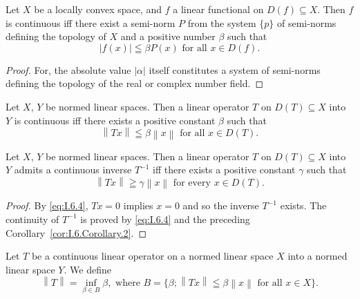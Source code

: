 \begin{corollary}\label{cor:I.6.Corollary.1} Let $X$ be a locally convex space, and $f$ a linear functional on $D(f) \subseteq X$. Then $f$ is continuous iff there exist a semi-norm $P$ from the system $\{p\}$ of semi-norms defining the topology of $X$ and a positive number $\beta$ such that 
\begin{equation}\label{eq:I.6.2}
\left| f (x) \right| \leqq \beta P(x) \text{ for all } x \in D (f).
\end{equation}
\end{corollary}

\begin{proof}
 For, the absolute value $|\alpha|$ itself constitutes a system of semi-norms defining the topology of the real or complex number field. 
\end{proof}

\begin{corollary}\label{cor:I.6.Corollary.2} Let $X$, $Y$ be normed linear spaces. Then a linear operator $T$ on $D(T) \subseteq X$ into $Y$ is continuous iff there exists a positive constant $\beta$ such that 
\begin{equation}\label{eq:I.6.3}
\left\| T x \right\| \leqq \beta \left\| x \right\| \text{ for all } x \in D (T).
\end{equation}
\end{corollary}

\begin{corollary}\label{cor:I.6.Corollary.3} Let $X$, $Y$ be normed linear spaces. Then a linear operator $T$ on $D(T) \subseteq X$ into $Y$ admits a continuous inverse $T^{-1}$ iff there exists a positive constant $\gamma$ such that 
\begin{equation}\label{eq:I.6.4}
\left\| T x \right\| \geqq \gamma \left\| x \right\| \text{ for every } x \in D (T).
\end{equation}
\end{corollary}

\begin{proof}
 By \eqref{eq:I.6.4}, $Tx = 0$ implies $x = 0$ and so the inverse $T^{-1}$ exists. The continuity of $T^{-1}$ is proved by \eqref{eq:I.6.4} and the preceding Corollary~\ref{cor:I.6.Corollary.2}. 
\end{proof}

\begin{definition}\label{def:I.6.Definition.1} Let $T$ be a continuous linear operator on a normed linear space $X$ into a normed linear space $Y$. We define 
\begin{equation}\label{eq:I.6.5}
\left\| T \right\| = \inf\limits_{\beta \in B} \beta , \text{ where } B = \{\beta ; \left\| T x \right\| \leqq \beta \left\| x \right\| \text{ for all } x \in X \}.
\end{equation}
\end{definition}

